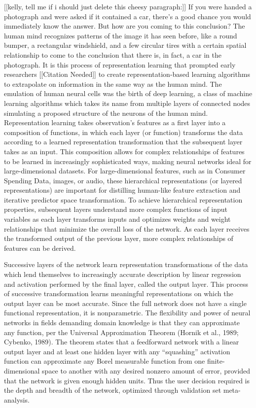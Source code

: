 \documentclass[12pt,twoside]{reedthesis}
\begin{document}
{[}{[}kelly, tell me if i should just delete this cheesy
paragraph:{]}{]} If you were handed a photograph and were asked if it
contained a car, there's a good chance you would immediately know the
answer. But how are you coming to this conclusion? The human mind
recognizes patterns of the image it has seen before, like a round
bumper, a rectangular windshield, and a few circular tires with a
certain spatial relationship to come to the conclusion that there is, in
fact, a car in the photograph. It is this process of representation
learning that prompted early researchers {[}{[}Citation Needed{]}{]} to
create representation-based learning algorithms to extrapolate on
information in the same way as the human mind. The emulation of human
neural cells was the birth of deep learning, a class of machine learning
algorithms which takes its name from multiple layers of connected nodes
simulating a proposed structure of the neurons of the human mind.
Representation learning takes observation's features as a first layer
into a composition of functions, in which each layer (or function)
transforms the data according to a learned representation transformation
that the subsequent layer takes as an input. This composition allows for
complex relationships of features to be learned in increasingly
sophisticated ways, making neural networks ideal for large-dimensional
datasets. For large-dimensional features, such as in Consumer Spending
Data, images, or audio, these hierarchical representations (or layered
representations) are important for distilling human-like feature
extraction and iterative predictor space transformation. To achieve
hierarchical representation properties, subsequent layers understand
more complex functions of input variables as each layer transforms
inputs and optimizes weights and weight relationships that minimize the
overall loss of the network. As each layer receives the transformed
output of the previous layer, more complex relationships of features can
be derived.

Successive layers of the network learn representation transformations of
the data which lend themselves to increasingly accurate description by
linear regression and activation performed by the final layer, called
the output layer. This process of successive transformation learns
meaningful representations on which the output layer can be most
accurate. Since the full network does not have a single functional
representation, it is nonparametric. The flexibility and power of neural
networks in fields demanding domain knowledge is that they can
approximate any function, per the Universal Approximation Theorem
(Hornik et al., 1989; Cybenko, 1989). The theorem states that a
feedforward network with a linear output layer and at least one hidden
layer with any ``squashing'' activation function can approximate any
Borel measurable function from one finite-dimensional space to another
with any desired nonzero amount of error, provided that the network is
given enough hidden units. Thus the user decision required is the depth
and breadth of the network, optimized through validation set
meta-analysis.
\end{document}
